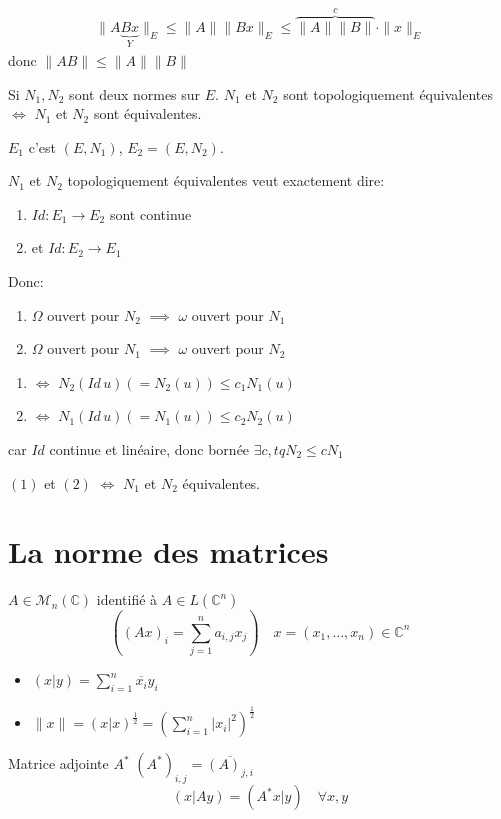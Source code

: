 \begin{preuve}
   \begin{align*}
       \|A\underbrace{Bx}_{Y}\|_{E} \le \|A\|\|Bx\|_{E} \le \overbrace{\|A\|\|B\|}^{c} \cdot \|x\|_{E}
   \end{align*} 
    donc $\|AB\| \le \|A\| \|B\|$
\end{preuve}
\begin{theorem}
    Si $N_1, N_2$ sont deux normes sur $E$.  $N_1$ et $N_2$ sont topologiquement équivalentes $\iff$ $N_1$ et $N_2$ sont équivalentes.
\end{theorem}
\begin{preuve}
   $E_1$ c'est $(E, N_1)$, $E_2 = (E, N_2)$.
   \par
   $N_1$ et $N_2$ topologiquement équivalentes veut exactement dire:
   \begin{enumerate}
       \item $Id: E_1 \to E_2$ sont continue 
       \item et $Id: E_2 \to E_1$
   \end{enumerate}
   Donc:
   \begin{enumerate}
       \item $\Omega$ ouvert  pour $N_2$ $\implies$ $\omega$ ouvert  pour  $N_1$
       \item $\Omega$ ouvert  pour $N_1$ $\implies$ $\omega$ ouvert pour  $N_2$
   \end{enumerate}

   \begin{enumerate}
       \item $\iff$ $N_2(Id \, u) (= N_2(u)) \le c_1N_1(u)$
       \item $\iff$ $N_1(Id \, u) (= N_1(u)) \le c_2N_2(u)$
   \end{enumerate}
   car $Id$ continue et linéaire, donc bornée  $\exists c, tq N_2 \le cN_1$
   \par
   $(1)$ et  $(2)$  $\iff$ $N_1$ et $N_2$ équivalentes.
\end{preuve}

\section{La norme des matrices}
$A \in \mathcal{M}_n(\mathbb{C})$ identifié à $A \in L(\mathbb{C}^n)$
\[
    \left( (Ax)_{i} = \sum_{j=1}^{n} a_{i, j}x_j \right) \quad x = (x_1, \ldots, x_n) \in \mathbb{C}^n
\] 
\begin{itemize}
    \item $(x|y) = \sum_{i=1}^{n} \overline{x_i}y_i$
    \item $\|x\| = (x|x)^{\frac{1}{2}} = \left( \sum_{i=1}^{n} |x_i|^2 \right)^{\frac{1}{2}}$
\end{itemize}
Matrice adjointe $A^*$  $(A^*)_{i,j} = \overline{(A)_{j,i}}$
 \[
     (x|Ay) = (A^*x|y) \quad \forall x,y
 \] 
